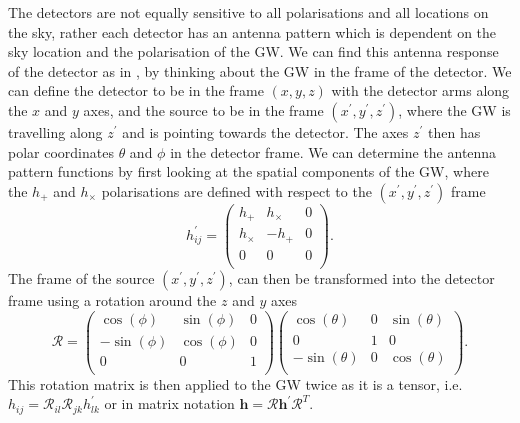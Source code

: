 The detectors are not equally sensitive to all polarisations and all locations
on the sky, rather each detector has an antenna pattern which is dependent on the sky
location and the polarisation of the \gls{GW}. We can find this antenna response of the detector as in
\citep{maggioreGravitationalWaves}, by thinking about the \gls{GW} in the frame
of the detector.  We can define the detector to be in the frame $(x,y,z)$ with
the detector arms along the $x$ and $y$ axes, and the source to be in the frame
$(x^{\prime},y^{\prime},z^{\prime})$, where the \gls{GW} is travelling along
$z^{'}$ and is pointing towards the detector.  The axes $z^{\prime}$ then has
polar coordinates $\theta$ and $\phi$ in the detector frame.  We can determine
the antenna pattern functions by first looking at the spatial components of the
\gls{GW},
where the $h_{+}$ and $h_{\times}$ polarisations are defined with respect to
the $(x^{\prime},y^{\prime},z^{\prime})$ frame
%
\begin{equation}
    \label{intro:detector:response:gwwave}
    h^{\prime}_{ij} = \left( 
    \begin{matrix} 
    h_{+} & h_{\times} & 0 \\
    h_{\times} & -h_{+} & 0 \\
    0 & 0 & 0  \\
    \end{matrix}
    \right).
\end{equation}
The frame of the source $(x^{\prime},y^{\prime},z^{\prime})$, can then be transformed into the detector frame using a rotation around the $z$ and $y$ axes 
\begin{equation}
    \label{intro:detector:response:rotation}
    \mathcal{R} = \left( 
    \begin{matrix} 
    \cos(\phi) & \sin(\phi) & 0 \\
    -\sin(\phi) & \cos(\phi) & 0 \\
    0 & 0 & 1  \\
    \end{matrix}
    \right)
    \left( 
    \begin{matrix} 
    \cos(\theta) & 0 & \sin(\theta) \\
    0 & 1 & 0 \\
    -\sin(\theta) & 0 & \cos(\theta)  \\
    \end{matrix}
    \right).
\end{equation}
This rotation matrix is then applied to the \gls{GW} twice as it is a tensor, i.e. $h_{ij} = \mathcal{R}_{il} \mathcal{R}_{jk} h^{\prime}_{lk} $ or in matrix notation $\bm{h} = \bm{\mathcal{R}} \bm{h}^{\prime} \bm{\mathcal{R}}^{T}$.

